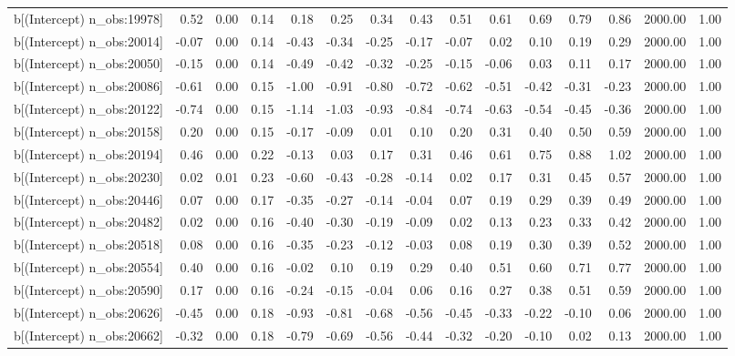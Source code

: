 \begin{table}[ht]
\begin{tabular}{rrrrrrrrrrrrrrr}
  b[(Intercept) n\_obs:19978] & 0.52 & 0.00 & 0.14 & 0.18 & 0.25 & 0.34 & 0.43 & 0.51 & 0.61 & 0.69 & 0.79 & 0.86 & 2000.00 & 1.00 \\ 
  b[(Intercept) n\_obs:20014] & -0.07 & 0.00 & 0.14 & -0.43 & -0.34 & -0.25 & -0.17 & -0.07 & 0.02 & 0.10 & 0.19 & 0.29 & 2000.00 & 1.00 \\ 
  b[(Intercept) n\_obs:20050] & -0.15 & 0.00 & 0.14 & -0.49 & -0.42 & -0.32 & -0.25 & -0.15 & -0.06 & 0.03 & 0.11 & 0.17 & 2000.00 & 1.00 \\ 
  b[(Intercept) n\_obs:20086] & -0.61 & 0.00 & 0.15 & -1.00 & -0.91 & -0.80 & -0.72 & -0.62 & -0.51 & -0.42 & -0.31 & -0.23 & 2000.00 & 1.00 \\ 
  b[(Intercept) n\_obs:20122] & -0.74 & 0.00 & 0.15 & -1.14 & -1.03 & -0.93 & -0.84 & -0.74 & -0.63 & -0.54 & -0.45 & -0.36 & 2000.00 & 1.00 \\ 
  b[(Intercept) n\_obs:20158] & 0.20 & 0.00 & 0.15 & -0.17 & -0.09 & 0.01 & 0.10 & 0.20 & 0.31 & 0.40 & 0.50 & 0.59 & 2000.00 & 1.00 \\ 
  b[(Intercept) n\_obs:20194] & 0.46 & 0.00 & 0.22 & -0.13 & 0.03 & 0.17 & 0.31 & 0.46 & 0.61 & 0.75 & 0.88 & 1.02 & 2000.00 & 1.00 \\ 
  b[(Intercept) n\_obs:20230] & 0.02 & 0.01 & 0.23 & -0.60 & -0.43 & -0.28 & -0.14 & 0.02 & 0.17 & 0.31 & 0.45 & 0.57 & 2000.00 & 1.00 \\ 
  b[(Intercept) n\_obs:20446] & 0.07 & 0.00 & 0.17 & -0.35 & -0.27 & -0.14 & -0.04 & 0.07 & 0.19 & 0.29 & 0.39 & 0.49 & 2000.00 & 1.00 \\ 
  b[(Intercept) n\_obs:20482] & 0.02 & 0.00 & 0.16 & -0.40 & -0.30 & -0.19 & -0.09 & 0.02 & 0.13 & 0.23 & 0.33 & 0.42 & 2000.00 & 1.00 \\ 
  b[(Intercept) n\_obs:20518] & 0.08 & 0.00 & 0.16 & -0.35 & -0.23 & -0.12 & -0.03 & 0.08 & 0.19 & 0.30 & 0.39 & 0.52 & 2000.00 & 1.00 \\ 
  b[(Intercept) n\_obs:20554] & 0.40 & 0.00 & 0.16 & -0.02 & 0.10 & 0.19 & 0.29 & 0.40 & 0.51 & 0.60 & 0.71 & 0.77 & 2000.00 & 1.00 \\ 
  b[(Intercept) n\_obs:20590] & 0.17 & 0.00 & 0.16 & -0.24 & -0.15 & -0.04 & 0.06 & 0.16 & 0.27 & 0.38 & 0.51 & 0.59 & 2000.00 & 1.00 \\ 
  b[(Intercept) n\_obs:20626] & -0.45 & 0.00 & 0.18 & -0.93 & -0.81 & -0.68 & -0.56 & -0.45 & -0.33 & -0.22 & -0.10 & 0.06 & 2000.00 & 1.00 \\ 
  b[(Intercept) n\_obs:20662] & -0.32 & 0.00 & 0.18 & -0.79 & -0.69 & -0.56 & -0.44 & -0.32 & -0.20 & -0.10 & 0.02 & 0.13 & 2000.00 & 1.00 \\ 

\end{tabular}
\end{table}
